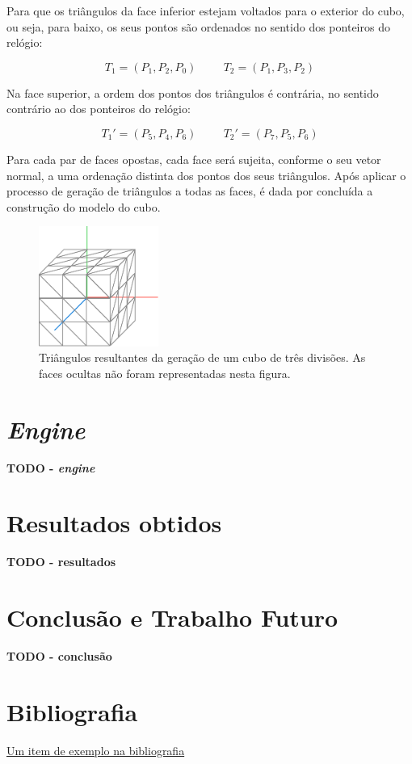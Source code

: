 \documentclass[12pt, a4paper]{article}
\begin{document}
Para que os triângulos da face inferior estejam voltados para o exterior do cubo, ou seja, para
baixo, os seus pontos são ordenados no sentido dos ponteiros do relógio:

$$
T_1 = (P_1, P_2, P_0)
\hspace{1cm}
T_2 = (P_1, P_3, P_2)
$$

Na face superior, a ordem dos pontos dos triângulos é contrária, no sentido contrário ao dos
ponteiros do relógio:

$$
T_1' = (P_5, P_4, P_6)
\hspace{1cm}
T_2' = (P_7, P_5, P_6)
$$

Para cada par de faces opostas, cada face será sujeita, conforme o seu vetor normal, a uma ordenação
distinta dos pontos dos seus triângulos. Após aplicar o processo de geração de triângulos a todas as
faces, é dada por concluída a construção do modelo do cubo.

\begin{figure}[H]
    \centering
    \includegraphics[width=0.35\textwidth]{res/figures/CubeTriangles.pdf}
    \caption{
        \onehalfspacing
        Triângulos resultantes da geração de um cubo de três divisões. As faces ocultas não foram
        representadas nesta figura.
    }
\end{figure}

\section{\emph{Engine}}

\textbf{\color{red} TODO - \emph{engine}}

\section{Resultados obtidos}

\textbf{\color{red} TODO - resultados}

\section{Conclusão e Trabalho Futuro}

\textbf{\color{red} TODO - conclusão}

\begingroup
\section{Bibliografia}
\renewcommand{\section}[2]{}

\begin{thebibliography}{9}
        \href{https://youtu.be/dQw4w9WgXcQ}{Um item de exemplo na bibliografia}
\end{thebibliography}
\endgroup
\end{document}
